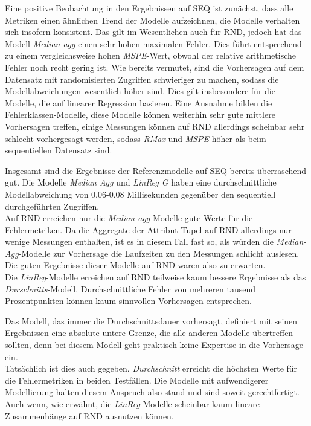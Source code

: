 \documentclass[
	twoside,
	12pt,
	a4paper,
	BCOR10mm,
	DIV14,
	listof=totoc,
	bibliography=totoc,
	headsepline
]{scrreprt}
\begin{document}
Eine positive Beobachtung in den Ergebnissen auf SEQ ist zunächst, dass alle Metriken einen ähnlichen Trend der  Modelle aufzeichnen, die Modelle verhalten sich insofern konsistent.
Das gilt im Wesentlichen auch für RND, jedoch hat das Modell \textit{Median agg} einen sehr hohen maximalen Fehler. Dies führt entsprechend zu einem vergleichsweise hohen \textit{MSPE}-Wert, obwohl der relative arithmetische Fehler noch recht gering ist.
Wie bereits vermutet, sind die Vorhersagen auf dem Datensatz mit randomisierten Zugriffen schwieriger zu machen, sodass die Modellabweichungen wesentlich höher sind.
Dies gilt insbesondere für die Modelle, die auf linearer Regression basieren.
Eine Ausnahme bilden die Fehlerklassen-Modelle, diese Modelle können weiterhin sehr gute mittlere Vorhersagen treffen, einige Messungen können auf RND allerdings scheinbar sehr schlecht vorhergesagt werden, sodass \textit{RMax} und \textit{MSPE} höher als beim sequentiellen Datensatz sind.\medskip

Insgesamt sind die Ergebnisse der Referenzmodelle auf SEQ bereits überraschend gut.
Die Modelle \textit{Median Agg} und \textit{LinReg G} haben eine durchschnittliche Modellabweichung von 0.06-0.08 Millisekunden gegenüber den sequentiell durchgeführten Zugriffen.\\
Auf RND erreichen nur die \textit{Median agg}-Modelle gute Werte für die Fehlermetriken.
Da die Aggregate der Attribut-Tupel auf RND allerdings nur wenige Messungen enthalten, ist es in diesem Fall fast so, als würden die \textit{Median-Agg}-Modelle zur Vorhersage die Laufzeiten zu den Messungen schlicht auslesen. Die guten Ergebnisse dieser Modelle auf RND waren also zu erwarten.\\
Die \textit{LinReg}-Modelle erreichen auf RND teilweise kaum bessere Ergebnisse als das \textit{Durschnitts}-Modell.
Durchschnittliche Fehler von mehreren tausend Prozentpunkten können kaum sinnvollen Vorhersagen entsprechen. \medskip

Das Modell, das immer die Durchschnittsdauer vorhersagt, definiert mit seinen Ergebnissen eine absolute untere Grenze, die alle anderen Modelle übertreffen sollten, denn bei diesem Modell geht praktisch keine Expertise in die Vorhersage ein.\\ 
Tatsächlich ist dies auch gegeben. \textit{Durchschnitt} erreicht die höchsten Werte für die Fehlermetriken in beiden Testfällen.
Die Modelle mit aufwendigerer Modellierung halten diesem Anspruch also stand und sind soweit gerechtfertigt. Auch wenn, wie erwähnt, die \textit{LinReg}-Modelle scheinbar kaum lineare Zusammenhänge auf RND ausnutzen können.\medskip
\end{document}
